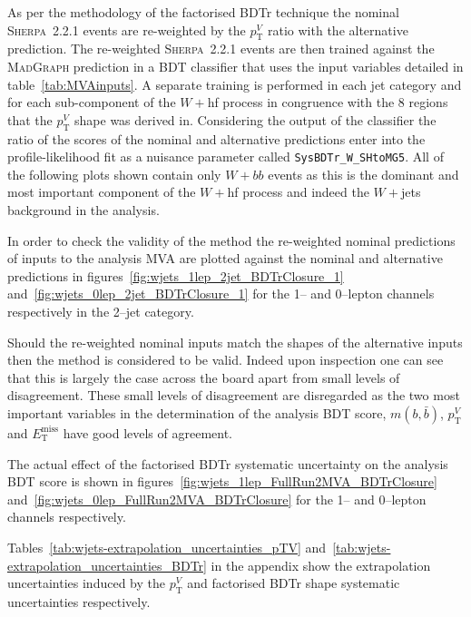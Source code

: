 As per the methodology of the factorised BDTr technique the nominal
\textsc{Sherpa}~2.2.1 events are re-weighted by the $p_{\mathrm{T}}^V$ ratio
with the alternative prediction. The re-weighted \textsc{Sherpa}~2.2.1 events
are then trained against the \textsc{MadGraph} prediction in a BDT classifier
that uses the input variables detailed in table~\ref{tab:MVAinputs}. A separate
training is performed in each jet category and for each sub-component of the
$W+$hf process in congruence with the 8 regions that the $p_{\mathrm{T}}^V$
shape was derived in. Considering the output of the classifier the ratio of the
scores of the nominal and alternative predictions enter into the
profile-likelihood fit as a nuisance parameter called
\texttt{SysBDTr\_W\_SHtoMG5}. All of the following plots shown contain only
$W+bb$ events as this is the dominant and most important component of the $W+$hf
process and indeed the $W+$jets background in the analysis.

In order to check the validity of the method the re-weighted nominal predictions
of inputs to the analysis MVA are plotted against the nominal and alternative
predictions in figures~\ref{fig:wjets_1lep_2jet_BDTrClosure_1}
and~\ref{fig:wjets_0lep_2jet_BDTrClosure_1} for the 1-- and 0--lepton channels
respectively in the 2--jet category.


Should the re-weighted nominal inputs match
the shapes of the alternative inputs then the method is considered to be valid.
Indeed upon inspection one can see that this is largely the case across the
board apart from small levels of disagreement. These small levels of
disagreement are disregarded as the two most important variables in the
determination of the analysis BDT score, $m(b, \bar{b})$, $p_{\mathrm{T}}^V$ and
$E_{\mathrm{T}}^{\text{miss}}$ have good levels of agreement.

The actual effect of the factorised BDTr systematic uncertainty on the analysis
BDT score is shown in figures~\ref{fig:wjets_1lep_FullRun2MVA_BDTrClosure}
and~\ref{fig:wjets_0lep_FullRun2MVA_BDTrClosure} for the 1-- and 0--lepton
channels respectively. 


Tables~\ref{tab:wjets-extrapolation_uncertainties_pTV}
and~\ref{tab:wjets-extrapolation_uncertainties_BDTr} in the appendix show the
extrapolation uncertainties induced by the $p_{\mathrm{T}}^V$ and factorised
BDTr shape systematic uncertainties respectively.
\clearpage
\newpage

